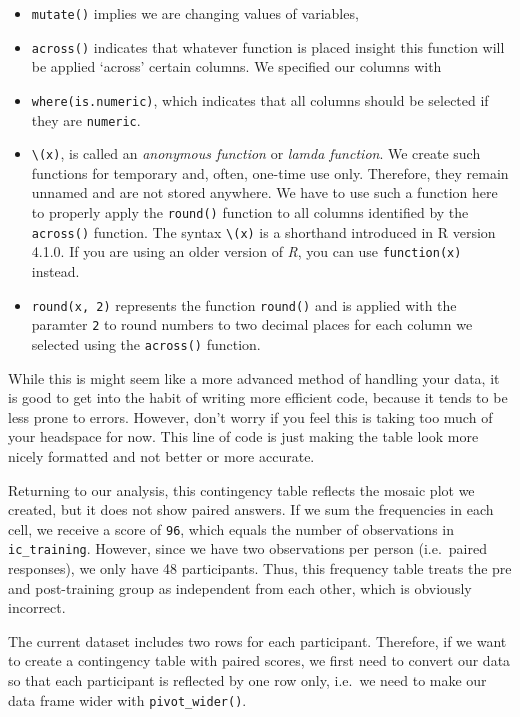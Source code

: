 \documentclass[
  letterpaper,
]{krantz}
\begin{document}
\begin{itemize}
\item
  \texttt{mutate()} implies we are changing values of variables,
\item
  \texttt{across()} indicates that whatever function is placed insight
  this function will be applied `across' certain columns. We specified
  our columns with
\item
  \texttt{where(is.numeric)}, which indicates that all columns should be
  selected if they are \texttt{numeric}.
\item
  \texttt{\textbackslash{}(x)}, is called an \emph{anonymous function}
  or \emph{lamda function}. We create such functions for temporary and,
  often, one-time use only. Therefore, they remain unnamed and are not
  stored anywhere. We have to use such a function here to properly apply
  the \texttt{round()} function to all columns identified by the
  \texttt{across()} function. The syntax \texttt{\textbackslash{}(x)} is
  a shorthand introduced in R version 4.1.0. If you are using an older
  version of \emph{R}, you can use \texttt{function(x)} instead.
\item
  \texttt{round(x,\ 2)} represents the function \texttt{round()} and is
  applied with the paramter \texttt{2} to round numbers to two decimal
  places for each column we selected using the \texttt{across()}
  function.
\end{itemize}

While this is might seem like a more advanced method of handling your
data, it is good to get into the habit of writing more efficient code,
because it tends to be less prone to errors. However, don't worry if you
feel this is taking too much of your headspace for now. This line of
code is just making the table look more nicely formatted and not better
or more accurate.

Returning to our analysis, this contingency table reflects the mosaic
plot we created, but it does not show paired answers. If we sum the
frequencies in each cell, we receive a score of \texttt{96}, which
equals the number of observations in \texttt{ic\_training}. However,
since we have two observations per person (i.e.~paired responses), we
only have 48 participants. Thus, this frequency table treats the pre and
post-training group as independent from each other, which is obviously
incorrect.

The current dataset includes two rows for each participant. Therefore,
if we want to create a contingency table with paired scores, we first
need to convert our data so that each participant is reflected by one
row only, i.e.~we need to make our data frame wider with
\texttt{pivot\_wider()}.
\end{document}
